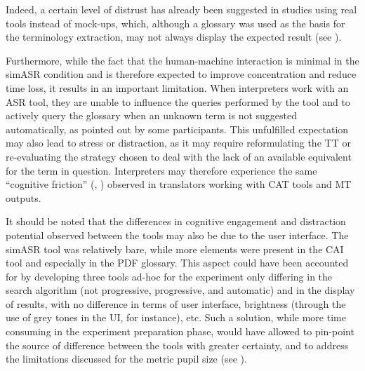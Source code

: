 Indeed, a certain level of distrust has already been suggested in studies using real tools instead of mock-ups, which, although a glossary was used as the basis for the terminology extraction, may not always display the expected result (see \citealt{van_cauwenberghe_etude_2020}).

Furthermore, while the fact that the human-machine interaction is minimal in the simASR condition and is therefore expected to improve concentration and reduce time loss, it results in an important limitation. When interpreters work with an ASR tool, they are unable to influence the queries performed by the tool and to actively query the glossary when an unknown term is not suggested automatically, as pointed out by some participants. This unfulfilled expectation may also lead to stress or distraction, as it may require reformulating the TT or re-evaluating the strategy chosen to deal with the lack of an available equivalent for the term in question. Interpreters may therefore experience the same ``cognitive friction'' (\citealt{OBrien_Ehrensberger-Dow_Connolly_Hasler_2017}, \citealt[19]{cooper_inmates_2004}) observed in translators working with CAT tools and MT outputs.

It should be noted that the differences in cognitive engagement and distraction potential observed between the tools may also be due to the user interface. The simASR tool was relatively bare, while more elements were present in the CAI tool and especially in the PDF glossary. This aspect could have been accounted for by developing three tools ad-hoc for the experiment only differing in the search algorithm (not progressive, progressive, and automatic) and in the display of results, with no difference in terms of user interface, brightness (through the use of grey tones in the UI, for instance), etc. Such a solution, while more time consuming in the experiment preparation phase, would have allowed to pin-point the source of difference between the tools with greater certainty, and to address the limitations discussed for the metric pupil size (see ).\largerpage

